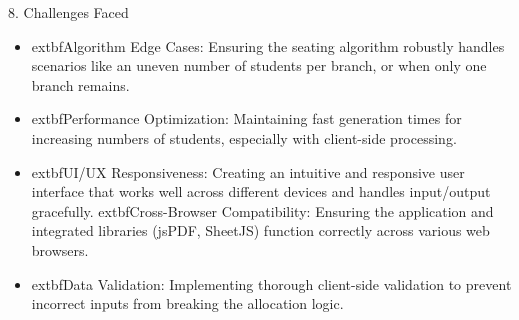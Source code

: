 \documentclass{beamer}
\begin{document}
\begin{frame}{8. Challenges Faced}
    \begin{itemize}
        \item 	extbf{Algorithm Edge Cases:} Ensuring the seating algorithm robustly handles scenarios like an uneven number of students per branch, or when only one branch remains.
        \item 	extbf{Performance Optimization:} Maintaining fast generation times for increasing numbers of students, especially with client-side processing.
        \item 	extbf{UI/UX Responsiveness:} Creating an intuitive and responsive user interface that works well across different devices and handles input/output gracefully.
        	extbf{Cross-Browser Compatibility:} Ensuring the application and integrated libraries (jsPDF, SheetJS) function correctly across various web browsers.
        \item 	extbf{Data Validation:} Implementing thorough client-side validation to prevent incorrect inputs from breaking the allocation logic.
    \end{itemize}
\end{frame}
\end{document}
